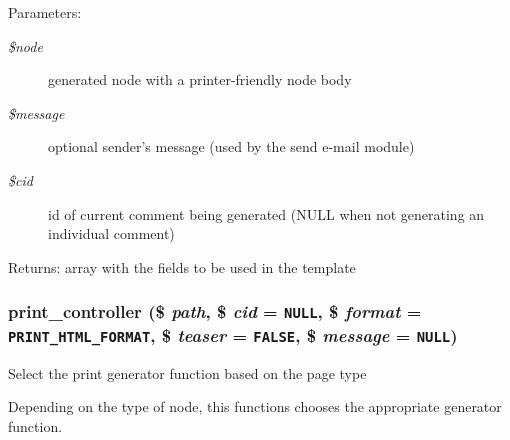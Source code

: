 \begin{Desc}
\item[Parameters:]
\begin{description}
\item[{\em \$node}]generated node with a printer-friendly node body \item[{\em \$message}]optional sender's message (used by the send e-mail module) \item[{\em \$cid}]id of current comment being generated (NULL when not generating an individual comment) \end{description}
\end{Desc}
\begin{Desc}
\item[Returns:]array with the fields to be used in the template \end{Desc}
\hypertarget{print_8pages_8inc_aef613d2eb4448233d3600d0d7259e95}{
\subsubsection[{print\_\-controller}]{\setlength{\rightskip}{0pt plus 5cm}print\_\-controller (\$ {\em path}, \/  \$ {\em cid} = {\tt NULL}, \/  \$ {\em format} = {\tt PRINT\_\-HTML\_\-FORMAT}, \/  \$ {\em teaser} = {\tt FALSE}, \/  \$ {\em message} = {\tt NULL})}}
\label{print_8pages_8inc_aef613d2eb4448233d3600d0d7259e95}


Select the print generator function based on the page type

Depending on the type of node, this functions chooses the appropriate generator function.

